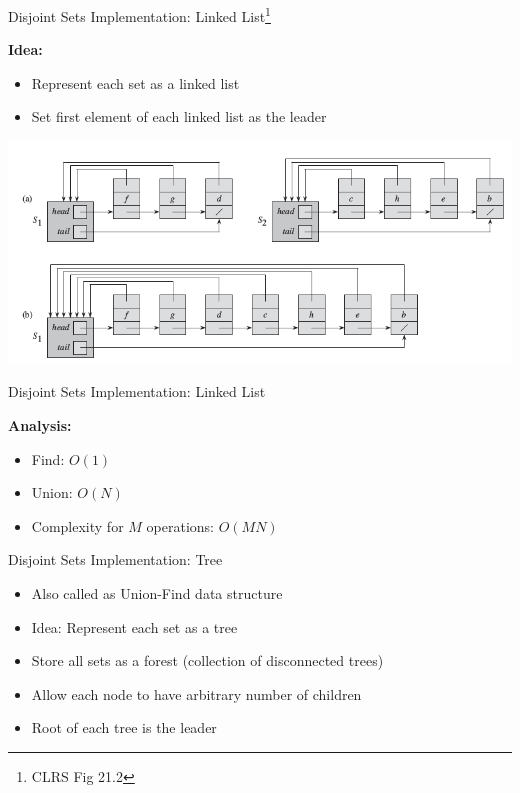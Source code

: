 \documentclass{beamer}
\begin{document}
\begin{frame}{Disjoint Sets Implementation: Linked List\footnote{CLRS Fig 21.2}}

        {\bf Idea:} 
        \begin{itemize}
            \item Represent each set as a linked list
            \item Set first element of each linked list as the leader
        \end{itemize}

        \begin{center}
            \includegraphics[scale=0.4]{unionFindLinkedList.png}
        \end{center}

\end{frame}

\begin{frame}{Disjoint Sets Implementation: Linked List}

    {\bf Analysis:}
    \begin{itemize}
        \item Find: \pause $O(1)$
        \item Union: \pause $O(N)$
        \item Complexity for $M$ operations: $O(MN)$
    \end{itemize}
\end{frame}

\begin{frame}{Disjoint Sets Implementation: Tree}
    \begin{itemize}
        \item Also called as Union-Find data structure
        \item Idea: Represent each set as a tree
        \item Store all sets as a forest (collection of disconnected trees)
        \item Allow each node to have arbitrary number of children
        \item Root of each tree is the leader
    \end{itemize}
\end{frame}
\end{document}
